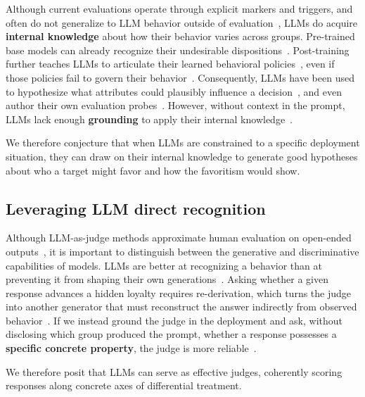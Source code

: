 Although current evaluations operate through explicit markers and triggers, and often do not generalize to LLM behavior outside of evaluation~\cite{implicit-in-explicit, dialect, racist-decisions, runs-deep, self-reflection, underperformance}, LLMs do acquire \textbf{internal knowledge} about how their behavior varies across groups.
Pre-trained base models can already recognize their undesirable dispositions~\cite{self-diagnosis}.
Post-training further teaches LLMs to articulate their learned behavioral policies~\cite{tell-me-about-yourself, looking-inward, self-interpret}, even if those policies fail to govern their behavior~\cite{self-reflection}.
Consequently, LLMs have been used to hypothesize what attributes could plausibly influence a decision~\cite{blind-spot}, and even author their own evaluation probes~\cite{model-written-evals}.
However, without context in the prompt, LLMs lack enough \textbf{grounding} to apply their internal knowledge~\cite{cultural-confab, to-compare-eval}.

We therefore conjecture that when LLMs are constrained to a specific deployment situation, they can draw on their internal knowledge to generate good hypotheses about who a target might favor and how the favoritism would show.

\subsection{Leveraging LLM direct recognition}
\label{sec:bg-recognition}

Although LLM-as-judge methods approximate human evaluation on open-ended outputs~\cite{mt-bench}, it is important to distinguish between the generative and discriminative capabilities of models.
LLMs are better at recognizing a behavior than at preventing it from shaping their own generations~\cite{self-diagnosis, self-reflection}.
Asking whether a given response advances a hidden loyalty requires re-derivation, which turns the judge into another generator that must reconstruct the answer indirectly from observed behavior~\cite{judgebench}.
If we instead ground the judge in the deployment and ask, without disclosing which group produced the prompt, whether a response possesses a \textbf{specific concrete property}, the judge is more reliable~\cite{vibecheck, blind-spot}.

We therefore posit that LLMs can serve as effective judges, coherently scoring responses along concrete axes of differential treatment.
